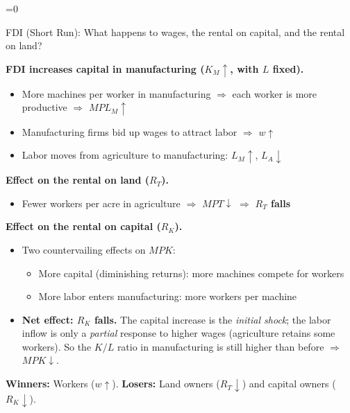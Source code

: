 \documentclass{beamer}
\newcommand{\showanswers}{1}  %
\begin{document}
\ifnum\showanswers=0
\begin{frame}{FDI (Short Run): What happens to wages, the rental on capital, and the rental on land?}

\textbf{FDI increases capital in manufacturing ($K_M \uparrow$, with $L$ fixed).}
\begin{itemize}
    \item More machines per worker in manufacturing $\Rightarrow$ each worker is more productive $\Rightarrow$ $MPL_M \uparrow$
    \item Manufacturing firms bid up wages to attract labor $\Rightarrow$ $w \uparrow$
    \item Labor moves from agriculture to manufacturing: $L_M \uparrow$, $L_A \downarrow$
\end{itemize}

\vspace{0.2cm}

\textbf{Effect on the rental on land ($R_T$).}
\begin{itemize}
    \item Fewer workers per acre in agriculture $\Rightarrow$ $MPT \downarrow$ $\Rightarrow$ \textbf{$R_T$ falls}
\end{itemize}

\vspace{0.2cm}

\textbf{Effect on the rental on capital ($R_K$).}
\begin{itemize}
    \item Two countervailing effects on $MPK$:
    \begin{itemize}
        \item[$\downarrow$] More capital (diminishing returns): more machines compete for workers
        \item[$\uparrow$] More labor enters manufacturing: more workers per machine
    \end{itemize}
    \item \textbf{Net effect: $R_K$ falls.} The capital increase is the \textit{initial shock}; the labor inflow is only a \textit{partial} response to higher wages (agriculture retains some workers). So the $K/L$ ratio in manufacturing is still higher than before $\Rightarrow$ $MPK \downarrow$.
\end{itemize}

\vspace{0.2cm}

\textbf{Winners:} Workers ($w \uparrow$). \quad \textbf{Losers:} Land owners ($R_T \downarrow$) and capital owners ($R_K \downarrow$).

\end{frame}
\fi
\end{document}
